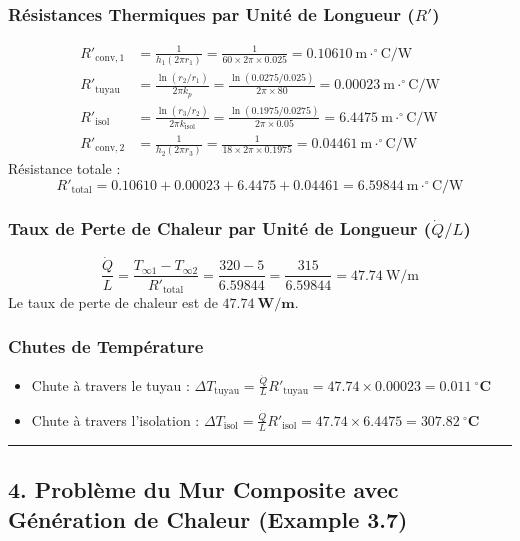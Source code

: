 \documentclass{rapportECL}
\begin{document}
\subsubsection*{Résistances Thermiques par Unité de Longueur ($R'$)}
\begin{align*}
    R'_{\text{conv}, 1} &= \frac{1}{h_1 (2\pi r_1)} = \frac{1}{60 \times 2\pi \times 0.025} = 0.10610 \ \text{m}\cdot^\circ\text{C/W} \\
    R'_{\text{tuyau}} &= \frac{\ln(r_2/r_1)}{2\pi k_p} = \frac{\ln(0.0275/0.025)}{2\pi \times 80} = 0.00023 \ \text{m}\cdot^\circ\text{C/W} \\
    R'_{\text{isol}} &= \frac{\ln(r_3/r_2)}{2\pi k_{\text{isol}}} = \frac{\ln(0.1975/0.0275)}{2\pi \times 0.05} = 6.4475 \ \text{m}\cdot^\circ\text{C/W} \\
    R'_{\text{conv}, 2} &= \frac{1}{h_2 (2\pi r_3)} = \frac{1}{18 \times 2\pi \times 0.1975} = 0.04461 \ \text{m}\cdot^\circ\text{C/W}
\end{align*}
Résistance totale :
$$R'_{\text{total}} = 0.10610 + 0.00023 + 6.4475 + 0.04461 = 6.59844 \ \text{m}\cdot^\circ\text{C/W}$$

\subsubsection*{Taux de Perte de Chaleur par Unité de Longueur ($\dot{Q}/L$)}
$$\frac{\dot{Q}}{L} = \frac{T_{\infty 1} - T_{\infty 2}}{R'_{\text{total}}} = \frac{320 - 5}{6.59844} = \frac{315}{6.59844} = 47.74 \ \text{W/m}$$
Le taux de perte de chaleur est de $\mathbf{47.74 \ \text{W/m}}$.

\subsubsection*{Chutes de Température}
\begin{itemize}
    \item Chute à travers le tuyau : $\Delta T_{\text{tuyau}} = \frac{\dot{Q}}{L} R'_{\text{tuyau}} = 47.74 \times 0.00023 = \mathbf{0.011 \ ^\circ\text{C}}$ 
    \item Chute à travers l'isolation : $\Delta T_{\text{isol}} = \frac{\dot{Q}}{L} R'_{\text{isol}} = 47.74 \times 6.4475 = \mathbf{307.82 \ ^\circ\text{C}}$ 
\end{itemize}

\vspace{0.5cm}
\hrule
\vspace{0.5cm}

\subsection*{4. Problème du Mur Composite avec Génération de Chaleur (Example 3.7)}
\end{document}
